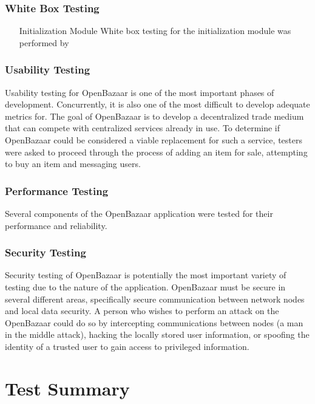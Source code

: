 \documentclass{article}
\begin{document}
\section{White Box Testing}
\begin{itemize}
\item[Initialization Module]
White box testing for the initialization module was performed by 
\end{itemize}

\section{Usability Testing}
Usability testing for OpenBazaar is one of the most important phases of development. Concurrently, it is also one of the most difficult to develop adequate metrics for. The goal of OpenBazaar is to develop a decentralized trade medium that can compete with centralized services already in use. \cite{reqs_doc} To determine if OpenBazaar could be considered a viable replacement for such a service, testers were asked to proceed through the process of adding an item for sale, attempting to buy an item and messaging users.

\section{Performance Testing}
Several components of the OpenBazaar application were tested for their performance and reliability. 

\section{Security Testing}
Security testing of OpenBazaar is potentially the most important variety of testing due to the nature of the application. OpenBazaar must be secure in several different areas, specifically secure communication between network nodes and local data security. A person who wishes to perform an attack on the OpenBazaar could do so by intercepting communications between nodes (a man in the middle attack), hacking the locally stored user information, or spoofing the identity of a trusted user to gain access to privileged information.
\part*{Test Summary}
\end{document}
